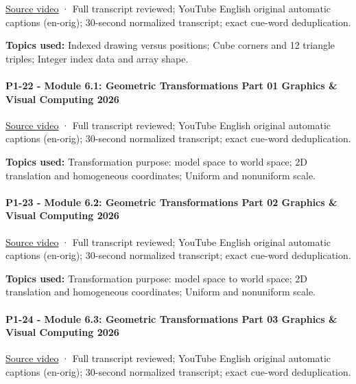 \href{https://www.youtube.com/watch?v=ztaaLo_SVjQ}{Source video} · Full transcript reviewed; YouTube English original automatic captions (en-orig); 30-second normalized transcript; exact cue-word deduplication.

\textbf{Topics used:} Indexed drawing versus positions; Cube corners and 12 triangle triples; Integer index data and array shape.

\paragraph{P1-22 - Module 6.1: Geometric Transformations Part 01 Graphics \& Visual Computing 2026}\label{p1-22---module-6.1-geometric-transformations-part-01-graphics-visual-computing-2026}

\href{https://www.youtube.com/watch?v=ynFh7s0SBpg}{Source video} · Full transcript reviewed; YouTube English original automatic captions (en-orig); 30-second normalized transcript; exact cue-word deduplication.

\textbf{Topics used:} Transformation purpose: model space to world space; 2D translation and homogeneous coordinates; Uniform and nonuniform scale.

\paragraph{P1-23 - Module 6.2: Geometric Transformations Part 02 Graphics \& Visual Computing 2026}\label{p1-23---module-6.2-geometric-transformations-part-02-graphics-visual-computing-2026}

\href{https://www.youtube.com/watch?v=Utop5s8YRM4}{Source video} · Full transcript reviewed; YouTube English original automatic captions (en-orig); 30-second normalized transcript; exact cue-word deduplication.

\textbf{Topics used:} Transformation purpose: model space to world space; 2D translation and homogeneous coordinates; Uniform and nonuniform scale.

\paragraph{P1-24 - Module 6.3: Geometric Transformations Part 03 Graphics \& Visual Computing 2026}\label{p1-24---module-6.3-geometric-transformations-part-03-graphics-visual-computing-2026}

\href{https://www.youtube.com/watch?v=CeHVh4oSX6g}{Source video} · Full transcript reviewed; YouTube English original automatic captions (en-orig); 30-second normalized transcript; exact cue-word deduplication.

